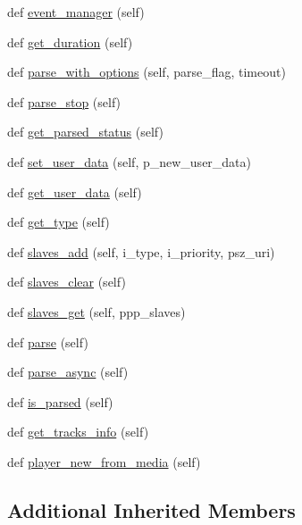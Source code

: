 \begin{DoxyCompactItemize}
\item 
def \hyperlink{classvlc_1_1_media_ab7c92812cd259eb8e4e4fd292b81bfaa}{event\+\_\+manager} (self)
\item 
def \hyperlink{classvlc_1_1_media_a2915bf55d38ef271444cdba23ba59f2f}{get\+\_\+duration} (self)
\item 
def \hyperlink{classvlc_1_1_media_afb65081211e54102a385d0557edea812}{parse\+\_\+with\+\_\+options} (self, parse\+\_\+flag, timeout)
\item 
def \hyperlink{classvlc_1_1_media_a2c7754adad2befe128c3a1ec5c914d67}{parse\+\_\+stop} (self)
\item 
def \hyperlink{classvlc_1_1_media_a22e2664718e78b59bc29672bbc486889}{get\+\_\+parsed\+\_\+status} (self)
\item 
def \hyperlink{classvlc_1_1_media_a58fa1fb63b70cc0b8efe7a5633afbc74}{set\+\_\+user\+\_\+data} (self, p\+\_\+new\+\_\+user\+\_\+data)
\item 
def \hyperlink{classvlc_1_1_media_a46e189dfe465a3463ea9a0fba87bf237}{get\+\_\+user\+\_\+data} (self)
\item 
def \hyperlink{classvlc_1_1_media_a1001d7b7b0e48724593b0a4334ca1b4e}{get\+\_\+type} (self)
\item 
def \hyperlink{classvlc_1_1_media_af2aadb97fb0c589f6c40c144679ad927}{slaves\+\_\+add} (self, i\+\_\+type, i\+\_\+priority, psz\+\_\+uri)
\item 
def \hyperlink{classvlc_1_1_media_a817ad40337d0e94ee7fffaa07b93d40a}{slaves\+\_\+clear} (self)
\item 
def \hyperlink{classvlc_1_1_media_a895c439fea0ce42b559aca5624857490}{slaves\+\_\+get} (self, ppp\+\_\+slaves)
\item 
def \hyperlink{classvlc_1_1_media_aed1b33c03102a60d1b12f3ec96850149}{parse} (self)
\item 
def \hyperlink{classvlc_1_1_media_a186ebdfb2e9a5ad6709213c61d7e3094}{parse\+\_\+async} (self)
\item 
def \hyperlink{classvlc_1_1_media_a94c3d6b6dcae451a9239a3ce8662e9d4}{is\+\_\+parsed} (self)
\item 
def \hyperlink{classvlc_1_1_media_ade0a1ca6f083233d0027e4b9fdb68d8a}{get\+\_\+tracks\+\_\+info} (self)
\item 
def \hyperlink{classvlc_1_1_media_a6cf2d750b6364dc903552fd0b097cca9}{player\+\_\+new\+\_\+from\+\_\+media} (self)
\end{DoxyCompactItemize}
\subsection*{Additional Inherited Members}


